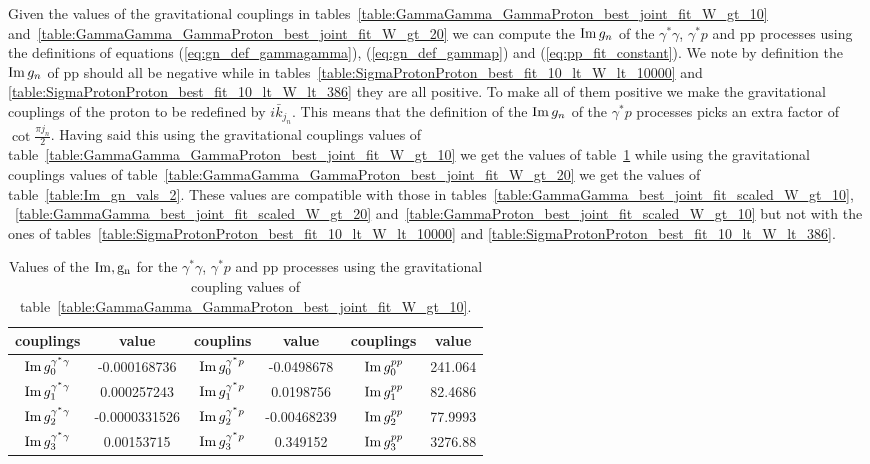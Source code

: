 \documentclass[preprint, 12pt]{elsarticle}
\begin{document}
Given the values of the gravitational couplings in tables~\ref{table:GammaGamma_GammaProton_best_joint_fit_W_gt_10} and~\ref{table:GammaGamma_GammaProton_best_joint_fit_W_gt_20} we can compute the ${\rm Im} \, g_n$ of the $\gamma^{*} \gamma$, $\gamma^* p$ and pp processes using the definitions of equations (\ref{eq:gn_def_gammagamma}), (\ref{eq:gn_def_gammap}) and (\ref{eq:pp_fit_constant}). We note by definition the ${\rm Im} \, g_n$ of pp should all be negative while in tables~\ref{table:SigmaProtonProton_best_fit_10_lt_W_lt_10000} and \ref{table:SigmaProtonProton_best_fit_10_lt_W_lt_386} they are all positive. To make all of them positive we make the gravitational couplings of the proton to be redefined by $i \bar{k}_{j_n}$. This means that the definition of the ${\rm Im} \, g_n$ of the $\gamma^* p$ processes picks an extra factor of $\cot \frac{\pi j_n}{2}$. Having said this using the gravitational couplings values of table~\ref{table:GammaGamma_GammaProton_best_joint_fit_W_gt_10} we get the values of table~\ref{table:Im_gn_vals_1} while using the gravitational couplings values of table~\ref{table:GammaGamma_GammaProton_best_joint_fit_W_gt_20} we get the values of table~\ref{table:Im_gn_vals_2}. These values are compatible with those in tables~\ref{table:GammaGamma_best_joint_fit_scaled_W_gt_10}, ~\ref{table:GammaGamma_best_joint_fit_scaled_W_gt_20} and~\ref{table:GammaProton_best_joint_fit_scaled_W_gt_10} but not with the ones of tables~\ref{table:SigmaProtonProton_best_fit_10_lt_W_lt_10000} and \ref{table:SigmaProtonProton_best_fit_10_lt_W_lt_386}.
\begin{table}[b!]
\centering
\caption{Values of the $\rm{Im} , g_n$ for the $\gamma^* \gamma$, $\gamma^* p$ and pp processes using the gravitational coupling values of table~\ref{table:GammaGamma_GammaProton_best_joint_fit_W_gt_10}.}
\vspace{0.5cm}
\begin{tabular}{|c|c|c|c|c|c|}
\hline
couplings   & value & couplins & value & couplings & value \\
\hline
${\rm Im} \, g_0^{\gamma^*\gamma}$  & -0.000168736 & ${\rm Im} \, g_0^{\gamma^*p}$ & -0.0498678 & ${\rm Im} \, g_0^{pp}$ & 241.064 \\ 
\hline
${\rm Im} \, g_1^{\gamma^*\gamma}$  & 0.000257243 & ${\rm Im} \, g_1^{\gamma^*p}$ & 0.0198756 & ${\rm Im} \, g_1^{pp}$ & 82.4686 \\ 
\hline
${\rm Im} \, g_2^{\gamma^*\gamma}$  & -0.0000331526 & ${\rm Im} \, g_2^{\gamma^*p}$ & -0.00468239 & ${\rm Im} \, g_2^{pp}$ & 77.9993 \\ 
\hline
${\rm Im} \, g_3^{\gamma^*\gamma}$  & 0.00153715 & ${\rm Im} \, g_3^{\gamma^*p}$ & 0.349152 & ${\rm Im} \, g_3^{pp}$ & 3276.88 \\ 
\hline
\end{tabular}
\label{table:Im_gn_vals_1}
\end{table}
\end{document}
